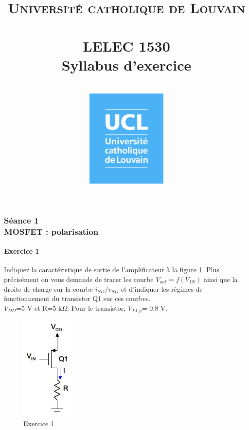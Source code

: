 \documentclass[paper=a4, fontsize=11pt]{article} %
\title{	
	\vspace{5cm}
	\normalfont \normalsize 
	\textsc{Universit\'e catholique de Louvain} \\ [25pt] %
	\horrule{2pt} \\[0.4cm] %
	\huge LELEC 1530  \\ Syllabus d'exercice \\%
	\horrule{2pt} \\[0.5cm] %
	\vspace{2cm}
	\centering
	\includegraphics[width=4cm]{figure/Logo_UCL_DEF_cadre_EPL_RVB.jpg}
}
\author{} %
\date{} %
\numberwithin{equation}{section} %
\numberwithin{figure}{section} %
\numberwithin{table}{section} %
\begin{document}
\newcommand{\vtn}{$V_{T0,n}$ }
\newcommand{\vtp}{$V_{T0,p}$ }
\newcommand{\vin}{$V_{IN}$ }
\newcommand{\vout}{$V_{OUT}$ }
\newcommand{\vov}{$V_{OV}$ }
\newcommand{\ids}{$I_{DS}$ }
\newcommand{\vdd}{$V_{DD}$ }
\newcommand{\vgs}{$V_{GS}$ }
\newcommand{\cgs}{$C_{GS}$ }
\newcommand{\cgd}{$C_{GD}$ }
\newcommand{\vbe}{$V_{BE}$ }
\newcommand{\veb}{$V_{EB}$ }
\newcommand{\vge}{$V_{GE}$ }
\newcommand{\vcc}{$V_{CC}$ }
\newcommand{\voutun}{$V_{OUT,1}$ }
\newcommand{\voutdeux}{$V_{OUT,2}$ }
\newcommand{\vea}{$V_{EA}$ }
\newcommand{\cox}{$C_{ox}$ }

\maketitle
\newpage
\null\newpage
{}
\tableofcontents
\newpage
{}

\part{}
\setcounter{section}{1}
\section{Séance 1\\ MOSFET : polarisation}
\subsection*{Exercice 1}
Indiquez la caractéristique de sortie de l'amplificateur à la figure \ref{fig1-1}. Plus précisément on vous demande de tracer les courbe $V_{out}=f(V_{IN})$ ainsi que la droite de charge sur la courbe $i_{SD}/v_{SD}$ et d'indiquer les régimes de fonctionnement du transistor Q1 sur ces courbes. \\$V_{DD}$=5 V et R=5 k$\Omega$. Pour le transistor, $V_{T0,p}$=-0.8 V.

\begin{figure}[!htbp]
   \centering
   \includegraphics[]{figure/fig1-1.png}
   \caption{Exercice 1}
   \label{fig1-1}
\end{figure}
\end{document}
